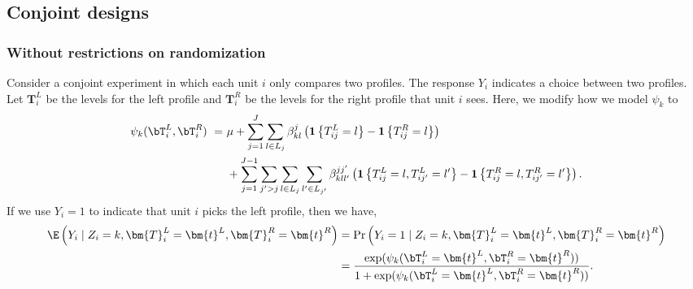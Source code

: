 \subsection{Conjoint designs}\label{append:amce_conjoint}

\subsubsection{Without restrictions on
  randomization}\label{append:con_unrest_rand}

Consider a conjoint experiment in which each unit $i$ only compares
two profiles.  The response $Y_i$ indicates a choice between two
profiles.  Let $\bm{T}_{i}^L$ be the levels for the left profile and
$\bm{T}_{i}^R$ be the levels for the right profile that unit $i$ sees.
Here, we modify how we model $\psi_k$ to
\begin{align*}
\begin{split}
\psi_k(\bT_i^L, \bT_i^R) \ = \ &  \mu + \sum_{j=1}^J \sum_{l \in L_j} \beta^j_{kl}\left(\mathbf{1}\left\{T^L_{ij}=l\right\}-\mathbf{1}\left\{T^R_{ij}=l\right\}\right)\\
& + \sum_{j=1}^{J-1} \sum_{j' > j} \sum_{l \in L_j} \sum_{l' \in L_{j'}} \beta^{jj'}_{kll'}\left(\mathbf{1}\left\{T^L_{ij}=l, T^L_{ij'}=l'\right\}-\mathbf{1}\left\{T^R_{ij}=l, T^R_{ij'}=l'\right\}\right).
\end{split}
\end{align*}
If we use $Y_i=1$ to indicate that unit $i$ picks the left profile, 
then we have,
  \begin{align*}
 \E\left(Y_i\mid Z_i=k, \bm{T}_{i}^L=\bm{t}^L, \bm{T}_{i}^R = \bm{t}^{R}\right)
  &= \Pr\left(Y_i = 1\mid Z_i=k, \bm{T}_{i}^L=\bm{t}^L, \bm{T}_{i}^R = \bm{t}^{R}\right)\\
 &= \frac{\exp(  \psi_k(\bT_i^L = \bm{t}^L, \bT_i^R=\bm{t}^R))}{1+\exp(\psi_k(\bT_i^L = \bm{t}^L, \bT_i^R=\bm{t}^R))}.
 \end{align*}

